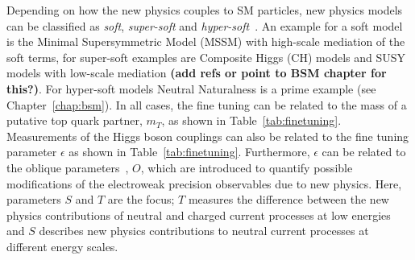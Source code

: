 \documentclass[../report.tex]{subfiles}
\newcommand{\ew}{electroweak\xspace}
\begin{document}
Depending on how the new physics couples to SM particles, new physics models can be classified as \textit{soft}, \textit{super-soft} and \textit{hyper-soft}~\cite{Contino:2017moj}. An example for a soft model is the Minimal Supersymmetric Model (MSSM) with high-scale mediation of the soft terms, for super-soft examples are Composite Higgs (CH) models and SUSY models with low-scale mediation \textbf{(add refs or point to BSM chapter for this?)}. For hyper-soft models Neutral Naturalness is a prime example (see Chapter~\ref{chap:bsm}). In all cases, the fine tuning can be related to the mass of a putative top quark partner, $m_T$, as shown in Table~\ref{tab:finetuning}. Measurements of the Higgs boson couplings can also be related to the fine tuning parameter $\epsilon$ as shown in Table~\ref{tab:finetuning}.
Furthermore, $\epsilon$ can be related to the oblique parameters~\cite{Peskin:1990zt,Peskin:1991sw,Altarelli:1991fk,Golden:1990ig, Barbieri:2004qk}, $O$, which are introduced to quantify possible modifications of the \ew precision observables due to new physics. Here, parameters $S$ and $T$ are the focus; $T$ measures the difference between the new physics contributions of neutral and charged current processes at low energies and $S$ describes new physics contributions to neutral current processes at different energy scales.
\end{document}
